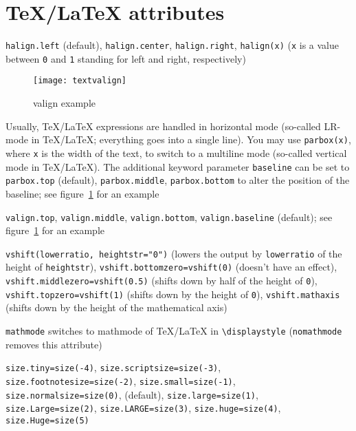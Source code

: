 \section{\TeX/\LaTeX{} attributes}

\begin{description}
\raggedright
\item[Horizontal alignment:] \verb|halign.left| (default),
\verb|halign.center|, \verb|halign.right|, \verb|halign(x)| (\verb|x|
is a value between \verb|0| and \verb|1| standing for left and right,
respectively)
\begin{figure}
\centerline{\texttt{[image: textvalign]}}
\caption{valign example}
\label{fig:textvalign}
\end{figure}
\item[Vertical box:] Usually, \TeX/\LaTeX{} expressions are handled in
horizontal mode (so-called LR-mode in \TeX/\LaTeX; everything goes
into a single line). You may use \verb|parbox(x)|, where \verb|x| is the
width of the text, to switch to a multiline mode (so-called vertical
mode in \TeX/\LaTeX). The additional keyword parameter \verb|baseline|
can be set to \verb|parbox.top| (default), \verb|parbox.middle|,
\verb|parbox.bottom| to alter the position of the baseline; see
figure~\ref{fig:textvalign} for an example
\item[Vertical alignment:] \verb|valign.top|, \verb|valign.middle|,
\verb|valign.bottom|, \verb|valign.baseline| (default); see
figure~\ref{fig:textvalign} for an example
\item[Vertical shift:] \verb|vshift(lowerratio, heightstr="0")|
(lowers the output by \verb|lowerratio| of the height of
\verb|heightstr|), \verb|vshift.bottomzero=vshift(0)| (doesn't have an
effect), \verb|vshift.middlezero=vshift(0.5)| (shifts down by half of
the height of \verb|0|), \verb|vshift.topzero=vshift(1)| (shifts down
by the height of \verb|0|), \verb|vshift.mathaxis| (shifts down by the
height of the mathematical axis)
\item[Mathmode:] \verb|mathmode| switches to mathmode of \TeX/\LaTeX{}
in \verb|\displaystyle| (\verb|nomathmode| removes this attribute)
\item[Font size:] \verb|size.tiny=size(-4)|,
\verb|size.scriptsize=size(-3)|, \verb|size.footnotesize=size(-2)|,
\verb|size.small=size(-1)|, \verb|size.normalsize=size(0)|,
(default), \verb|size.large=size(1)|, \verb|size.Large=size(2)|,
\verb|size.LARGE=size(3)|, \verb|size.huge=size(4)|,
\verb|size.Huge=size(5)|
\end{description}

